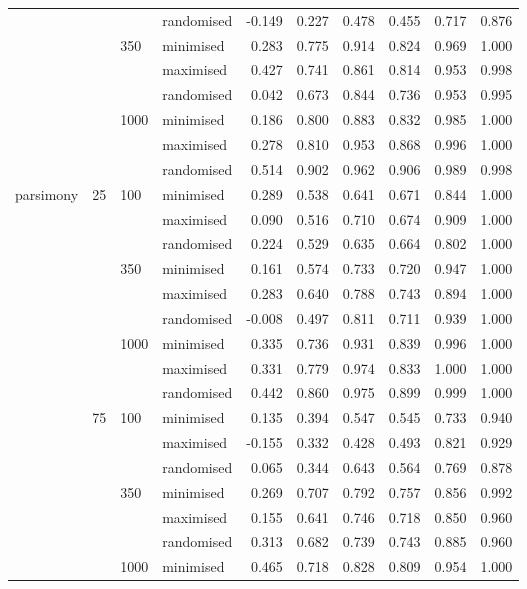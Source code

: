 \begin{longtable}{llllrrrrrr}
   &  &  & randomised & -0.149 & 0.227 & 0.478 & 0.455 & 0.717 & 0.876 \\ 
   &  & 350 & minimised & 0.283 & 0.775 & 0.914 & 0.824 & 0.969 & 1.000 \\ 
   &  &  & maximised & 0.427 & 0.741 & 0.861 & 0.814 & 0.953 & 0.998 \\ 
   &  &  & randomised & 0.042 & 0.673 & 0.844 & 0.736 & 0.953 & 0.995 \\ 
   &  & 1000 & minimised & 0.186 & 0.800 & 0.883 & 0.832 & 0.985 & 1.000 \\ 
   &  &  & maximised & 0.278 & 0.810 & 0.953 & 0.868 & 0.996 & 1.000 \\ 
   &  &  & randomised & 0.514 & 0.902 & 0.962 & 0.906 & 0.989 & 0.998 \\ 
  parsimony & 25 & 100 & minimised & 0.289 & 0.538 & 0.641 & 0.671 & 0.844 & 1.000 \\ 
   &  &  & maximised & 0.090 & 0.516 & 0.710 & 0.674 & 0.909 & 1.000 \\ 
   &  &  & randomised & 0.224 & 0.529 & 0.635 & 0.664 & 0.802 & 1.000 \\ 
   &  & 350 & minimised & 0.161 & 0.574 & 0.733 & 0.720 & 0.947 & 1.000 \\ 
   &  &  & maximised & 0.283 & 0.640 & 0.788 & 0.743 & 0.894 & 1.000 \\ 
   &  &  & randomised & -0.008 & 0.497 & 0.811 & 0.711 & 0.939 & 1.000 \\ 
   &  & 1000 & minimised & 0.335 & 0.736 & 0.931 & 0.839 & 0.996 & 1.000 \\ 
   &  &  & maximised & 0.331 & 0.779 & 0.974 & 0.833 & 1.000 & 1.000 \\ 
   &  &  & randomised & 0.442 & 0.860 & 0.975 & 0.899 & 0.999 & 1.000 \\ 
   & 75 & 100 & minimised & 0.135 & 0.394 & 0.547 & 0.545 & 0.733 & 0.940 \\ 
   &  &  & maximised & -0.155 & 0.332 & 0.428 & 0.493 & 0.821 & 0.929 \\ 
   &  &  & randomised & 0.065 & 0.344 & 0.643 & 0.564 & 0.769 & 0.878 \\ 
   &  & 350 & minimised & 0.269 & 0.707 & 0.792 & 0.757 & 0.856 & 0.992 \\ 
   &  &  & maximised & 0.155 & 0.641 & 0.746 & 0.718 & 0.850 & 0.960 \\ 
   &  &  & randomised & 0.313 & 0.682 & 0.739 & 0.743 & 0.885 & 0.960 \\ 
   &  & 1000 & minimised & 0.465 & 0.718 & 0.828 & 0.809 & 0.954 & 1.000 \\ 

\end{longtable}
